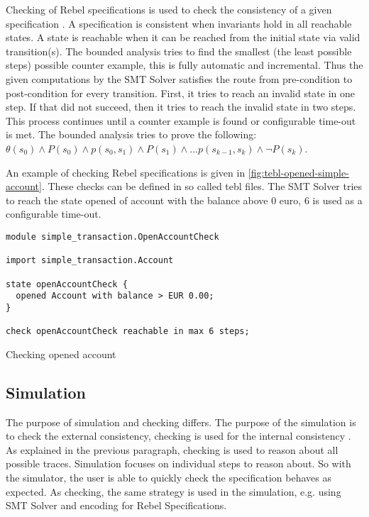Checking of Rebel specifications is used to check the consistency of a given specification \cite[p.5]{stoel_storm_vinju_bosman_2016}. A specification is consistent when invariants hold in all reachable states. A state is reachable when it can be reached from the initial state via valid transition(s).
The bounded analysis tries to find the smallest (the least possible steps) possible counter example, this is fully automatic and incremental. Thus the given computations by the SMT Solver satisfies the route from pre-condition to post-condition for every transition.
First, it tries to reach an invalid state in one step. If that did not succeed, then it tries to reach the invalid state in two steps. This process continues until a counter example is found or configurable time-out is met. The bounded analysis tries to prove the following: $\theta (s_{0}) \land P(s_{0}) \land p(s_{0}, s_{1}) \land P(s_{1}) \land \dots p(s_{k-1}, s_{k}) \land \neg P(s_{k})$.

An example of checking Rebel specifications is given in \autoref{fig:tebl-opened-simple-account}. These checks can be defined in so called tebl files. The SMT Solver tries to reach the state opened of account with the balance above 0 euro, 6 is used as a configurable time-out.

\begin{sourcecode}[h]
\begin{lstlisting}[]
module simple_transaction.OpenAccountCheck

import simple_transaction.Account

state openAccountCheck {
  opened Account with balance > EUR 0.00;
}

check openAccountCheck reachable in max 6 steps;
\end{lstlisting}
\caption{Checking opened account}
\label{fig:tebl-opened-simple-account}
\end{sourcecode}


\subsection{Simulation}
The purpose of simulation and checking differs. The purpose of the simulation is to check the external consistency, checking is used for the internal consistency \cite[p.5]{stoel_storm_vinju_bosman_2016}. As explained in the previous paragraph, checking is used to reason about all possible traces. Simulation focuses on individual steps to reason about. So with the simulator, the user is able to quickly check the specification behaves as expected. As checking, the same strategy is used in the simulation, e.g. using SMT Solver and encoding for Rebel Specifications.